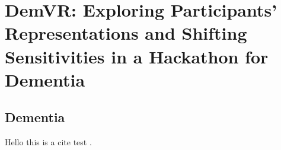 \chapter{DemVR: Exploring Participants' Representations and Shifting Sensitivities in a Hackathon for Dementia}
\label{DemVR}

\section{Dementia}
\label{sec:Dementia}
Hello this is a cite test \cite{hodge2019exploring}.  \citep{Chan2015,hodge2019exploring}